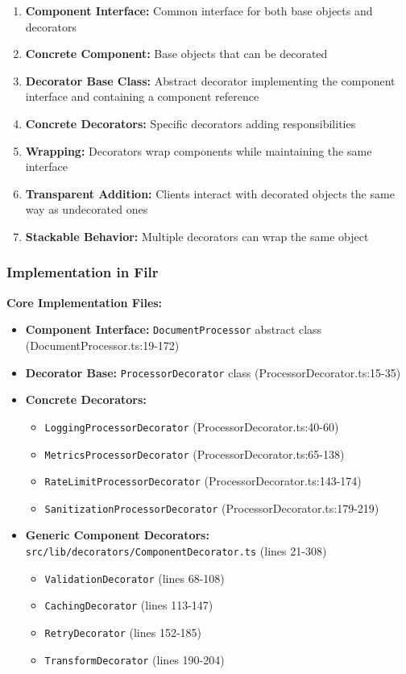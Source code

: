 \documentclass[11pt]{article}
\begin{document}
\begin{enumerate}[noitemsep]
    \item \textbf{Component Interface:} Common interface for both base objects and decorators
    \item \textbf{Concrete Component:} Base objects that can be decorated
    \item \textbf{Decorator Base Class:} Abstract decorator implementing the component interface and containing a component reference
    \item \textbf{Concrete Decorators:} Specific decorators adding responsibilities
    \item \textbf{Wrapping:} Decorators wrap components while maintaining the same interface
    \item \textbf{Transparent Addition:} Clients interact with decorated objects the same way as undecorated ones
    \item \textbf{Stackable Behavior:} Multiple decorators can wrap the same object
\end{enumerate}

\subsubsection{Implementation in Filr}

\textbf{Core Implementation Files:}
\begin{itemize}[noitemsep]
    \item \textbf{Component Interface:} \texttt{DocumentProcessor} abstract class (DocumentProcessor.ts:19-172)
    \item \textbf{Decorator Base:} \texttt{ProcessorDecorator} class (ProcessorDecorator.ts:15-35)
    \item \textbf{Concrete Decorators:}
    \begin{itemize}[noitemsep]
        \item \texttt{LoggingProcessorDecorator} (ProcessorDecorator.ts:40-60)
        \item \texttt{MetricsProcessorDecorator} (ProcessorDecorator.ts:65-138)
        \item \texttt{RateLimitProcessorDecorator} (ProcessorDecorator.ts:143-174)
        \item \texttt{SanitizationProcessorDecorator} (ProcessorDecorator.ts:179-219)
    \end{itemize}
    \item \textbf{Generic Component Decorators:} \texttt{src/lib/decorators/ComponentDecorator.ts} (lines 21-308)
    \begin{itemize}[noitemsep]
        \item \texttt{ValidationDecorator} (lines 68-108)
        \item \texttt{CachingDecorator} (lines 113-147)
        \item \texttt{RetryDecorator} (lines 152-185)
        \item \texttt{TransformDecorator} (lines 190-204)
    \end{itemize}
\end{itemize}
\end{document}
